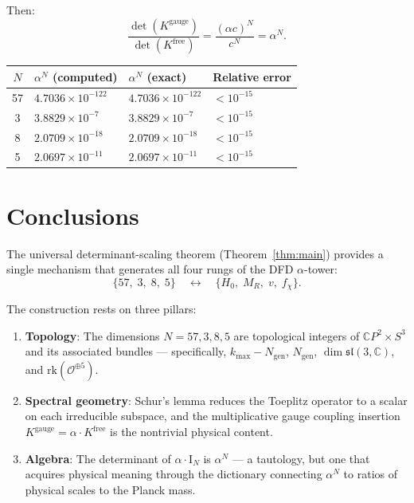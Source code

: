 \documentclass[11pt]{article}
\theoremstyle{definition}
\theoremstyle{remark}
\newcommand{\CP}{\mathbb{C}P}
\newcommand{\Id}{\mathrm{I}}
\begin{document}
Then:
\begin{equation}
\frac{\det(K^{\mathrm{gauge}})}{\det(K^{\mathrm{free}})}
= \frac{(\alpha c)^N}{c^N} = \alpha^N.
\end{equation}

\begin{center}
\renewcommand{\arraystretch}{1.3}
\begin{tabular}{clll}
\toprule
$N$ & $\alpha^N$ (computed) & $\alpha^N$ (exact) & Relative error \\
\midrule
57 & $4.7036 \times 10^{-122}$ & $4.7036 \times 10^{-122}$ & $< 10^{-15}$ \\
3  & $3.8829 \times 10^{-7}$ & $3.8829 \times 10^{-7}$ & $< 10^{-15}$ \\
8  & $2.0709 \times 10^{-18}$ & $2.0709 \times 10^{-18}$ & $< 10^{-15}$ \\
5  & $2.0697 \times 10^{-11}$ & $2.0697 \times 10^{-11}$ & $< 10^{-15}$ \\
\bottomrule
\end{tabular}
\end{center}


\section{Conclusions}
\label{sec:conclusions}

The universal determinant-scaling theorem (Theorem~\ref{thm:main})
provides a single mechanism that generates all four rungs of the DFD
$\alpha$-tower:
\begin{equation}
\{57,\; 3,\; 8,\; 5\} \quad \longleftrightarrow \quad
\{H_0,\; M_R,\; v,\; f_\chi\}.
\end{equation}

The construction rests on three pillars:
\begin{enumerate}
\item \textbf{Topology}: The dimensions $N = 57, 3, 8, 5$ are
topological integers of $\CP^2 \times S^3$ and its associated bundles
--- specifically, $k_{\max} - N_{\mathrm{gen}}$,
$N_{\mathrm{gen}}$, $\dim \mathfrak{sl}(3,\mathbb{C})$, and
$\mathrm{rk}(\mathcal{O}^{\oplus 5})$.

\item \textbf{Spectral geometry}: Schur's lemma reduces the Toeplitz
operator to a scalar on each irreducible subspace, and the
multiplicative gauge coupling insertion
$K^{\mathrm{gauge}} = \alpha \cdot K^{\mathrm{free}}$ is the
nontrivial physical content.

\item \textbf{Algebra}: The determinant of $\alpha \cdot \Id_N$ is
$\alpha^N$ --- a tautology, but one that acquires physical meaning
through the dictionary connecting $\alpha^N$ to ratios of physical
scales to the Planck mass.
\end{enumerate}
\end{document}

